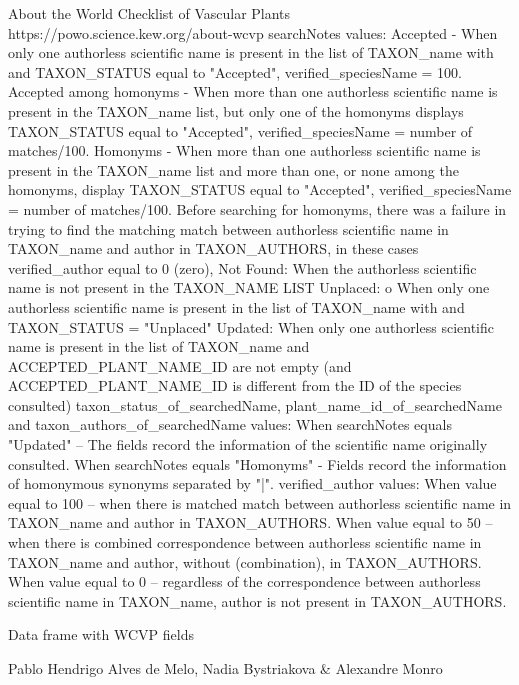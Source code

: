 \documentclass[a4paper]{book}
\begin{document}
%
\begin{Details}
About the World Checklist of Vascular Plants https://powo.science.kew.org/about-wcvp
searchNotes values:
Accepted - When only one authorless scientific name is present in the list of TAXON\_name with and TAXON\_STATUS equal to "Accepted",
verified\_speciesName = 100.
Accepted among homonyms - When more than one authorless scientific name is present in the TAXON\_name list, but only one of the homonyms displays TAXON\_STATUS equal to "Accepted",
verified\_speciesName = number of matches/100.
Homonyms - When more than one authorless scientific name is present in the TAXON\_name list and more than one, or none among the homonyms, display TAXON\_STATUS equal to "Accepted",
verified\_speciesName = number of matches/100.
Before searching for homonyms, there was a failure in trying to find the matching match between authorless scientific name in TAXON\_name and author in TAXON\_AUTHORS, in these cases verified\_author equal to 0 (zero),
Not Found: When the authorless scientific name is not present in the TAXON\_NAME LIST
Unplaced: o	When only one authorless scientific name is present in the list of TAXON\_name with and TAXON\_STATUS = "Unplaced"
Updated: When only one authorless scientific name is present in the list of TAXON\_name and ACCEPTED\_PLANT\_NAME\_ID are not empty (and ACCEPTED\_PLANT\_NAME\_ID is different from the ID of the species consulted)
taxon\_status\_of\_searchedName, plant\_name\_id\_of\_searchedName and taxon\_authors\_of\_searchedName values:
When searchNotes equals "Updated" – The fields record the information of the scientific name originally consulted.
When searchNotes equals "Homonyms" - Fields record the information of homonymous synonyms separated by "|".
verified\_author values:
When value equal to 100 – when there is matched match between authorless scientific name in TAXON\_name and author in TAXON\_AUTHORS.
When value equal to 50 – when there is combined correspondence between authorless scientific name in TAXON\_name and author, without (combination), in TAXON\_AUTHORS.
When value equal to 0 – regardless of the correspondence between authorless scientific name in TAXON\_name, author is not present in TAXON\_AUTHORS.
\end{Details}
%
\begin{Value}
Data frame with WCVP fields
\end{Value}
%
\begin{Author}
Pablo Hendrigo Alves de Melo,
Nadia Bystriakova \&
Alexandre Monro
\end{Author}
\end{document}
